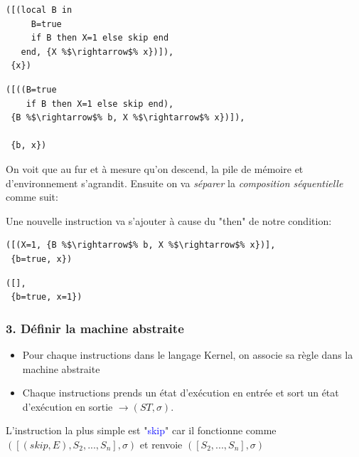 \documentclass{report}
\begin{document}
\begin{minipage}[t]{0.45\linewidth}
\begin{lstlisting}[caption={On avance d'un cran}, escapechar=\%]
([(local B in
     B=true
     if B then X=1 else skip end
   end, {X %$\rightarrow$% x})]),
 {x})
\end{lstlisting}
\end{minipage}
%
\begin{minipage}[t]{0.45\linewidth}
\begin{lstlisting}[caption={On avance d'un cran}, escapechar=\%]
([((B=true
    if B then X=1 else skip end),
 {B %$\rightarrow$% b, X %$\rightarrow$% x})]),
 
 {b, x})
\end{lstlisting}
\end{minipage}

On voit que au fur et à mesure qu'on descend, la pile de mémoire et d'environnement s'agrandit. Ensuite on va \textit{séparer} la \textit{composition séquentielle} comme suit:

Une nouvelle instruction va s'ajouter à cause du "then" de notre condition:

\begin{minipage}[t]{0.45\linewidth}
\begin{lstlisting}[caption={On avance d'un cran}, escapechar=\%]
([(X=1, {B %$\rightarrow$% b, X %$\rightarrow$% x})],
 {b=true, x})
\end{lstlisting}
\end{minipage}
%
\begin{minipage}[t]{0.45\linewidth}
\begin{lstlisting}[caption={On avance d'un cran}, escapechar=\%]
([],
 {b=true, x=1})
\end{lstlisting}
\end{minipage}

\subsubsection{3. Définir la machine abstraite}
\begin{itemize}
\item Pour chaque instructions dans le langage Kernel, on associe sa règle dans la machine abstraite
\item Chaque instructions prends un état d'exécution en entrée et sort un état d'exécution en sortie $\rightarrow (ST, \sigma)$.
\end{itemize}
L'instruction la plus simple est "\textcolor{blue}{skip}" car il fonctionne comme $([(skip, E), S_2, ..., S_n], \sigma)$ et renvoie $([S_2,..., S_n], \sigma)$ 
\end{document}
